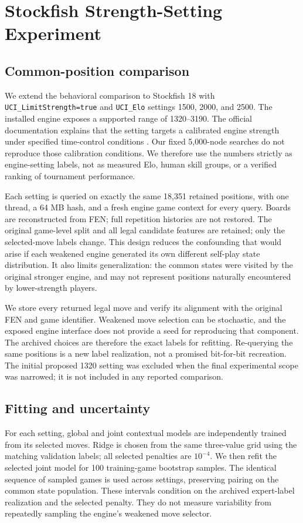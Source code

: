 \documentclass{jcst}
\begin{document}
\section{Stockfish Strength-Setting Experiment}
\subsection{Common-position comparison}
We extend the behavioral comparison to Stockfish 18 with \texttt{UCI\_LimitStrength=true} and \texttt{UCI\_Elo} settings 1500, 2000, and 2500. The installed engine exposes a supported range of 1320--3190. The official documentation explains that the setting targets a calibrated engine strength under specified time-control conditions \cite{stockfishuci}. Our fixed 5,000-node searches do not reproduce those calibration conditions. We therefore use the numbers strictly as engine-setting labels, not as measured Elo, human skill groups, or a verified ranking of tournament performance.

Each setting is queried on exactly the same 18,351 retained positions, with one thread, a 64 MB hash, and a fresh engine game context for every query. Boards are reconstructed from FEN; full repetition histories are not restored. The original game-level split and all legal candidate features are retained; only the selected-move labels change. This design reduces the confounding that would arise if each weakened engine generated its own different self-play state distribution. It also limits generalization: the common states were visited by the original stronger engine, and may not represent positions naturally encountered by lower-strength players.

We store every returned legal move and verify its alignment with the original FEN and game identifier. Weakened move selection can be stochastic, and the exposed engine interface does not provide a seed for reproducing that component. The archived choices are therefore the exact labels for refitting. Re-querying the same positions is a new label realization, not a promised bit-for-bit recreation. The initial proposed 1320 setting was excluded when the final experimental scope was narrowed; it is not included in any reported comparison.

\subsection{Fitting and uncertainty}
For each setting, global and joint contextual models are independently trained from its selected moves. Ridge is chosen from the same three-value grid using the matching validation labels; all selected penalties are $10^{-4}$. We then refit the selected joint model for 100 training-game bootstrap samples. The identical sequence of sampled games is used across settings, preserving pairing on the common state population. These intervals condition on the archived expert-label realization and the selected penalty. They do not measure variability from repeatedly sampling the engine's weakened move selector.
\end{document}
